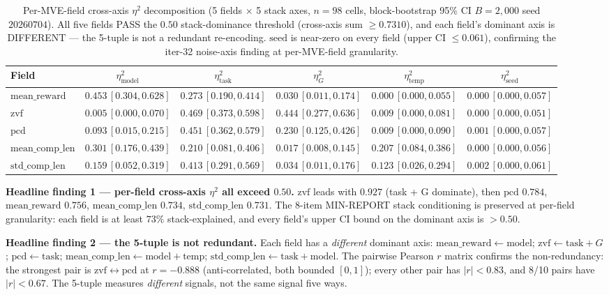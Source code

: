 \begin{table}[t]
\centering\small
\caption{Per-MVE-field cross-axis $\eta^2$ decomposition (5 fields
$\times$ 5 stack axes, $n{=}98$ cells, block-bootstrap 95\% CI
$B{=}2{,}000$ seed $20260704$). All five fields PASS the
$0.50$ stack-dominance threshold (cross-axis sum
$\geq 0.7310$), and each field's dominant axis is DIFFERENT —
the 5-tuple is not a redundant re-encoding. $\mathrm{seed}$ is
near-zero on every field (upper CI $\leq 0.061$), confirming the
iter-32 noise-axis finding at per-MVE-field granularity.}
\label{tab:p5-mve-field}
\begin{tabular}{lccccc}
\toprule
Field & $\eta^2_{\mathrm{model}}$ & $\eta^2_{\mathrm{task}}$ &
$\eta^2_G$ & $\eta^2_{\mathrm{temp}}$ & $\eta^2_{\mathrm{seed}}$ \\
\midrule
$\mathrm{mean\_reward}$ &
$0.453\,[0.304,0.628]$ & $0.273\,[0.190,0.414]$ &
$0.030\,[0.011,0.174]$ & $0.000\,[0.000,0.055]$ &
$0.000\,[0.000,0.057]$ \\
$\mathrm{zvf}$ &
$0.005\,[0.000,0.070]$ & $0.469\,[0.373,0.598]$ &
$0.444\,[0.277,0.636]$ & $0.009\,[0.000,0.081]$ &
$0.000\,[0.000,0.051]$ \\
$\mathrm{pcd}$ &
$0.093\,[0.015,0.215]$ & $0.451\,[0.362,0.579]$ &
$0.230\,[0.125,0.426]$ & $0.009\,[0.000,0.090]$ &
$0.001\,[0.000,0.057]$ \\
$\mathrm{mean\_comp\_len}$ &
$0.301\,[0.176,0.439]$ & $0.210\,[0.081,0.406]$ &
$0.017\,[0.008,0.145]$ & $0.207\,[0.084,0.386]$ &
$0.000\,[0.000,0.056]$ \\
$\mathrm{std\_comp\_len}$ &
$0.159\,[0.052,0.319]$ & $0.413\,[0.291,0.569]$ &
$0.034\,[0.011,0.176]$ & $0.123\,[0.026,0.294]$ &
$0.002\,[0.000,0.061]$ \\
\bottomrule
\end{tabular}
\end{table}

\textbf{Headline finding 1 — per-field cross-axis $\eta^2$ all exceed
$0.50$.} $\mathrm{zvf}$ leads with $0.927$ (task + G dominate), then
$\mathrm{pcd}$ $0.784$, $\mathrm{mean\_reward}$ $0.756$,
$\mathrm{mean\_comp\_len}$ $0.734$, $\mathrm{std\_comp\_len}$
$0.731$. The 8-item MIN-REPORT stack conditioning is preserved at
per-field granularity: each field is at least $73\%$ stack-explained,
and every field's upper CI bound on the dominant axis is
$>\!0.50$.

\textbf{Headline finding 2 — the 5-tuple is not redundant.} Each
field has a \emph{different} dominant axis:
$\mathrm{mean\_reward} \leftarrow \mathrm{model}$;
$\mathrm{zvf} \leftarrow \mathrm{task} + G$;
$\mathrm{pcd} \leftarrow \mathrm{task}$;
$\mathrm{mean\_comp\_len} \leftarrow \mathrm{model} + \mathrm{temp}$;
$\mathrm{std\_comp\_len} \leftarrow \mathrm{task} + \mathrm{model}$.
The pairwise Pearson $r$ matrix confirms the non-redundancy: the
strongest pair is $\mathrm{zvf} \leftrightarrow \mathrm{pcd}$
at $r = -0.888$ (anti-correlated, both bounded $[0,1]$); every other
pair has $|r| < 0.83$, and 8/10 pairs have $|r| < 0.67$. The
5-tuple measures \emph{different} signals, not the same signal five
ways.

